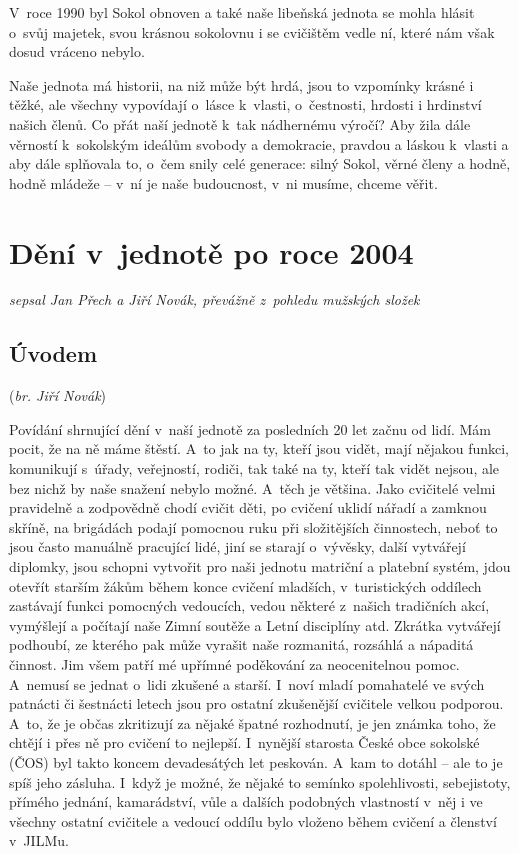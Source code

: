 \documentclass[a5paper, 12pt, twoside]{article}
\begin{document}
V~roce 1990 byl Sokol obnoven a také naše libeňská jednota se mohla
hlásit o~svůj majetek, svou krásnou sokolovnu i se cvičištěm vedle ní,
které nám však dosud vráceno nebylo.

Naše jednota má historii, na niž může být hrdá, jsou to vzpomínky krásné
i těžké, ale všechny vypovídají o~lásce k~vlasti, o~čestnosti, hrdosti i
hrdinství našich členů. Co přát naší jednotě k~tak nádhernému výročí?
Aby žila dále věrností k~sokolským ideálům svobody a demokracie, pravdou
a láskou k~vlasti a aby dále splňovala to, o~čem snily celé generace:
silný Sokol, věrné členy a hodně, hodně mládeže --⁠⁠⁠⁠⁠⁠ v~ní je naše
budoucnost, v~ni musíme, chceme věřit.

\section{Dění v~jednotě po roce
2004}

\textit{sepsal Jan Přech a Jiří Novák, převážně z~pohledu mužských složek}

\subsection{Úvodem}

(\textit{br. Jiří Novák})

Povídání shrnující dění v~naší jednotě za posledních 20 let začnu od
lidí. Mám pocit, že na ně máme štěstí. A~to jak na ty, kteří jsou vidět,
mají nějakou funkci, komunikují s~úřady, veřejností, rodiči, tak také na
ty, kteří tak vidět nejsou, ale bez nichž by naše snažení nebylo možné.
A~těch je většina. Jako cvičitelé velmi pravidelně a zodpovědně chodí
cvičit děti, po cvičení uklidí nářadí a zamknou skříně, na brigádách
podají pomocnou ruku při složitějších činnostech, neboť to jsou často
manuálně pracující lidé, jiní se starají o~vývěsky, další vytvářejí
diplomky, jsou schopni vytvořit pro naši jednotu matriční a platební
systém, jdou otevřít starším žákům během konce cvičení mladších,
v~turistických oddílech zastávají funkci pomocných vedoucích, vedou
některé z~našich tradičních akcí, vymýšlejí a počítají naše Zimní
soutěže a Letní disciplíny atd. Zkrátka vytvářejí podhoubí, ze kterého
pak může vyrašit naše rozmanitá, rozsáhlá a nápaditá činnost. Jim všem
patří mé upřímné poděkování za neocenitelnou pomoc. A~nemusí se jednat
o~lidi zkušené a starší. I~noví mladí pomahatelé ve svých patnácti či
šestnácti letech jsou pro ostatní zkušenější cvičitele velkou podporou.
A~to, že je občas zkritizují za nějaké špatné rozhodnutí, je jen známka
toho, že chtějí i přes ně pro cvičení to nejlepší. I~nynější starosta
České obce sokolské (ČOS) byl takto koncem devadesátých let peskován.
A~kam to dotáhl -- ale to je spíš jeho zásluha. I~když je možné, že nějaké
to semínko spolehlivosti, sebejistoty, přímého jednání, kamarádství,
vůle a dalších podobných vlastností v~něj i ve všechny ostatní cvičitele
a vedoucí oddílu bylo vloženo během cvičení a členství v~JILMu.
\end{document}
